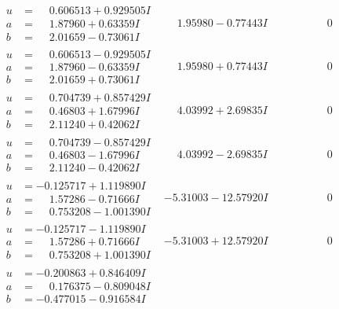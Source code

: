 \documentclass[1p]{elsarticle_modified}
\theoremstyle{definition}
\begin{document}
$$\begin{array}{c|c|c}
\begin{aligned}
u &= \phantom{-}0.606513 + 0.929505 I \\
a &= \phantom{-}1.87960 + 0.63359 I \\
b &= \phantom{-}2.01659 - 0.73061 I\end{aligned}
 & \phantom{-}1.95980 - 0.77443 I & \phantom{-0.000000 } 0 \\ \hline\begin{aligned}
u &= \phantom{-}0.606513 - 0.929505 I \\
a &= \phantom{-}1.87960 - 0.63359 I \\
b &= \phantom{-}2.01659 + 0.73061 I\end{aligned}
 & \phantom{-}1.95980 + 0.77443 I & \phantom{-0.000000 } 0 \\ \hline\begin{aligned}
u &= \phantom{-}0.704739 + 0.857429 I \\
a &= \phantom{-}0.46803 + 1.67996 I \\
b &= \phantom{-}2.11240 + 0.42062 I\end{aligned}
 & \phantom{-}4.03992 + 2.69835 I & \phantom{-0.000000 } 0 \\ \hline\begin{aligned}
u &= \phantom{-}0.704739 - 0.857429 I \\
a &= \phantom{-}0.46803 - 1.67996 I \\
b &= \phantom{-}2.11240 - 0.42062 I\end{aligned}
 & \phantom{-}4.03992 - 2.69835 I & \phantom{-0.000000 } 0 \\ \hline\begin{aligned}
u &= -0.125717 + 1.119890 I \\
a &= \phantom{-}1.57286 - 0.71666 I \\
b &= \phantom{-}0.753208 - 1.001390 I\end{aligned}
 & -5.31003 - 12.57920 I & \phantom{-0.000000 } 0 \\ \hline\begin{aligned}
u &= -0.125717 - 1.119890 I \\
a &= \phantom{-}1.57286 + 0.71666 I \\
b &= \phantom{-}0.753208 + 1.001390 I\end{aligned}
 & -5.31003 + 12.57920 I & \phantom{-0.000000 } 0 \\ \hline\begin{aligned}
u &= -0.200863 + 0.846409 I \\
a &= \phantom{-}0.176375 - 0.809048 I \\
b &= -0.477015 - 0.916584 I\end{aligned}

\end{array}$$
\end{document}
